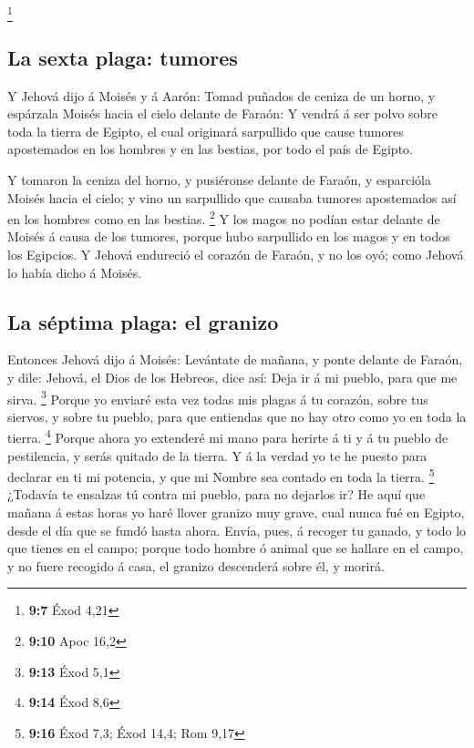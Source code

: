 \footnote{\textbf{9:7} Éxod 4,21}

\hypertarget{la-sexta-plaga-tumores}{%
\subsection{La sexta plaga: tumores}\label{la-sexta-plaga-tumores}}

 Y Jehová dijo á Moisés y á Aarón: Tomad puñados de ceniza
de un horno, y espárzala Moisés hacia el cielo delante de Faraón:
 Y vendrá á ser polvo sobre toda la tierra de Egipto, el
cual originará sarpullido que cause tumores apostemados en los hombres y
en las bestias, por todo el país de Egipto.

 Y tomaron la ceniza del horno, y pusiéronse delante de
Faraón, y esparcióla Moisés hacia el cielo; y vino un sarpullido que
causaba tumores apostemados así en los hombres como en las bestias.
\footnote{\textbf{9:10} Apoc 16,2}  Y los magos no podían
estar delante de Moisés á causa de los tumores, porque hubo sarpullido
en los magos y en todos los Egipcios.  Y Jehová endureció
el corazón de Faraón, y no los oyó; como Jehová lo había dicho á Moisés.

\hypertarget{la-suxe9ptima-plaga-el-granizo}{%
\subsection{La séptima plaga: el
granizo}\label{la-suxe9ptima-plaga-el-granizo}}

 Entonces Jehová dijo á Moisés: Levántate de mañana, y
ponte delante de Faraón, y dile: Jehová, el Dios de los Hebreos, dice
así: Deja ir á mi pueblo, para que me sirva. \footnote{\textbf{9:13}
  Éxod 5,1}  Porque yo enviaré esta vez todas mis plagas
á tu corazón, sobre tus siervos, y sobre tu pueblo, para que entiendas
que no hay otro como yo en toda la tierra. \footnote{\textbf{9:14} Éxod
  8,6}  Porque ahora yo extenderé mi mano para herirte á
ti y á tu pueblo de pestilencia, y serás quitado de la tierra.
 Y á la verdad yo te he puesto para declarar en ti mi
potencia, y que mi Nombre sea contado en toda la tierra. \footnote{\textbf{9:16}
  Éxod 7,3; Éxod 14,4; Rom 9,17}  ¿Todavía te ensalzas tú
contra mi pueblo, para no dejarlos ir?  He aquí que
mañana á estas horas yo haré llover granizo muy grave, cual nunca fué en
Egipto, desde el día que se fundó hasta ahora.  Envía,
pues, á recoger tu ganado, y todo lo que tienes en el campo; porque todo
hombre ó animal que se hallare en el campo, y no fuere recogido á casa,
el granizo descenderá sobre él, y morirá.

